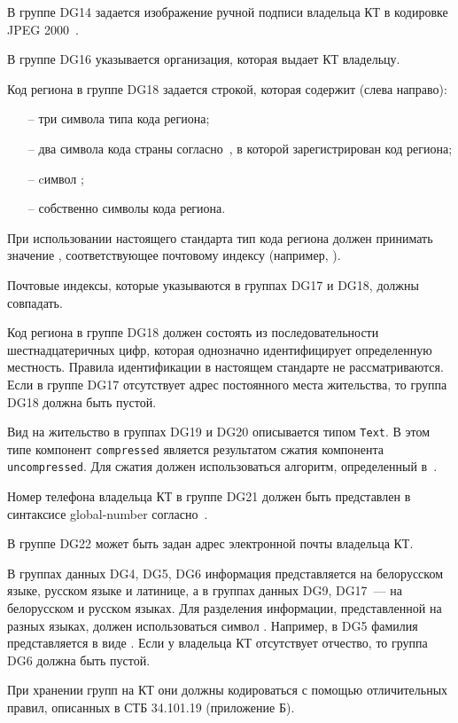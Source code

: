 В группе DG14 задается изображение ручной подписи
владельца КТ в кодировке JPEG 2000~\cite{JPEG2000}.

В группе DG16 указывается организация, которая выдает КТ владельцу. 

Код региона в группе DG18 задается строкой, которая содержит (слева направо):
\begin{itemize}
\item[--]
три символа типа кода региона;
\item[--]
два символа кода страны согласно~\cite{CountryCodes}, в которой зарегистрирован 
код региона;
\item[--]
cимвол \str{-}; 
\item[--]
собственно символы кода региона.
\end{itemize}

При использовании настоящего стандарта тип кода региона
должен принимать значение , соответствующее
почтовому индексу (например, ).

Почтовые индексы, которые указываются в группах DG17 и DG18,
должны совпадать.

Код региона в группе DG18 должен состоять из последовательности 
шестнадцатеричных цифр, которая однозначно идентифицирует определенную 
местность. Правила идентификации в настоящем стандарте не рассматриваются. 
Если в группе DG17 отсутствует адрес постоянного места жительства, то 
группа DG18 должна быть пустой. 
\fi


Вид на жительство в группах DG19 и DG20 описывается типом \verb|Text|. 
В этом типе компонент \verb|compressed| является результатом сжатия компонента 
\verb|uncompressed|. Для сжатия должен использоваться алгоритм, 
определенный в~\cite{DEFLATE}. 
\fi

Номер телефона владельца КТ в группе DG21 должен быть
представлен в синтаксисе global-number согласно~\cite{RFC3966}. 

В группе DG22 может быть задан адрес электронной почты владельца КТ. 

В группах данных DG4, DG5, DG6 информация представляется на 
белорусском языке, русском языке и латинице, 
а в группах данных DG9, DG17~--- на белорусском и русском языках.
Для разделения информации, представленной на разных языках,
должен использоваться символ \str{/}. Например, в DG5 фамилия 
представляется в виде .
Если у владельца КТ отсутствует отчество, то группа DG6 должна быть пустой. 

При хранении групп на КТ они должны кодироваться с помощью отличительных 
правил, описанных в СТБ 34.101.19 (приложение Б). 

